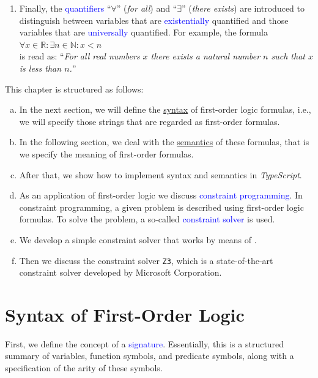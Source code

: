 \begin{enumerate}
      $x > 1 \rightarrow x + 7 < x \cdot  7$.
\item Finally, the \textcolor{blue}{quantifiers} ``$\forall$'' (\emph{for all}) and
      ``$\exists$'' (\emph{there exists}) are introduced to distinguish between variables that are
      \textcolor{blue}{existentially} quantified and those variables that are \textcolor{blue}{universally}
      quantified.  For example, the formula 
      \\[0.2cm]
      \hspace*{1.3cm}
      $\forall x \in \mathbb{R}: \exists n \in \mathbb{N}: x < n$
      \\[0.2cm]
      is read as: ``\textsl{For all real numbers $x$ there exists a natural number $n$ such that $x$ is less
        than $n$.}''
\end{enumerate}
This chapter is structured as follows:
\begin{enumerate}[(a)]
\item In the next section, we will define the \href{https://en.wikipedia.org/wiki/Syntax}{syntax} of
      first-order logic formulas, i.e., we will specify those strings that are regarded as first-order
      formulas.
\item In the following section, we deal with the
      \href{https://en.wikipedia.org/wiki/Semantics}{semantics} of these formulas, that is we specify the 
      meaning of first-order formulas.
\item After that, we show how to implement syntax and semantics in \textsl{TypeScript}.
\item As an application of first-order logic we discuss \textcolor{blue}{constraint programming}.
      In constraint programming, a given problem is described using first-order logic formulas.
      To solve the problem, a so-called \textcolor{blue}{constraint solver} is used.
\item We develop a simple constraint solver that works by means of .
\item Then we discuss the constraint solver \texttt{Z3}, which is a state-of-the-art constraint solver
      developed by Microsoft Corporation.
\end{enumerate}

\section{Syntax of First-Order Logic}
First, we define the concept of a \textcolor{blue}{signature}. Essentially, this is a
structured summary of variables, function symbols, and predicate symbols, along with a specification of the
arity of these symbols. 


